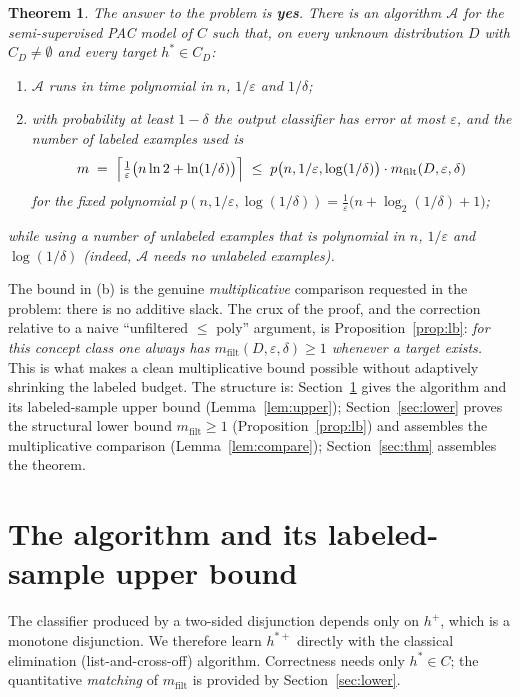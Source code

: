 \documentclass{amsart}
\newtheorem{theorem}{Theorem}
\theoremstyle{definition}
\newcommand{\eps}{\varepsilon}
\begin{document}
\begin{theorem}\label{thm:main}
The answer to the problem is \textbf{yes}. There is an algorithm $\mathcal A$
for the semi-supervised PAC model of $C$ such that, on every unknown
distribution $D$ with $C_D\neq\emptyset$ and every target $h^\ast\in C_D$:
\begin{enumerate}
\item[(a)] $\mathcal A$ runs in time polynomial in $n$, $1/\eps$ and
$1/\delta$;
\item[(b)] with probability at least $1-\delta$ the output classifier has error
at most $\eps$, and the number of labeled examples used is
\[
  m \;=\; \Bigl\lceil \tfrac{1}{\eps}\bigl(n\ln 2+\ln(1/\delta)\bigr)\Bigr\rceil
  \;\le\; p\bigl(n,1/\eps,\log(1/\delta)\bigr)\cdot
          m_{\mathrm{filt}}(D,\eps,\delta)
\]
for the fixed polynomial $p(n,1/\eps,\log(1/\delta))=\tfrac1\eps\bigl(n+\log_2(1/\delta)+1\bigr)$;
\end{enumerate}
while using a number of unlabeled examples that is polynomial in $n$, $1/\eps$
and $\log(1/\delta)$ (indeed, $\mathcal A$ needs no unlabeled examples).
\end{theorem}

The bound in (b) is the genuine \emph{multiplicative} comparison requested in
the problem: there is no additive slack. The crux of the proof, and the
correction relative to a naive ``unfiltered $\le$ poly'' argument, is
Proposition~\ref{prop:lb}: \emph{for this concept class one always has
$m_{\mathrm{filt}}(D,\eps,\delta)\ge1$ whenever a target exists.} This is what
makes a clean multiplicative bound possible without adaptively shrinking the
labeled budget. The structure is: Section~\ref{sec:alg} gives the algorithm and
its labeled-sample upper bound (Lemma~\ref{lem:upper}); Section~\ref{sec:lower}
proves the structural lower bound $m_{\mathrm{filt}}\ge1$
(Proposition~\ref{prop:lb}) and assembles the multiplicative comparison
(Lemma~\ref{lem:compare}); Section~\ref{sec:thm} assembles the theorem.

\section{The algorithm and its labeled-sample upper bound}\label{sec:alg}

The classifier produced by a two-sided disjunction depends only on $h^+$, which
is a monotone disjunction. We therefore learn $h^{\ast+}$ directly with the
classical elimination (list-and-cross-off) algorithm. Correctness needs only
$h^\ast\in C$; the quantitative \emph{matching} of $m_{\mathrm{filt}}$ is
provided by Section~\ref{sec:lower}.
\end{document}
